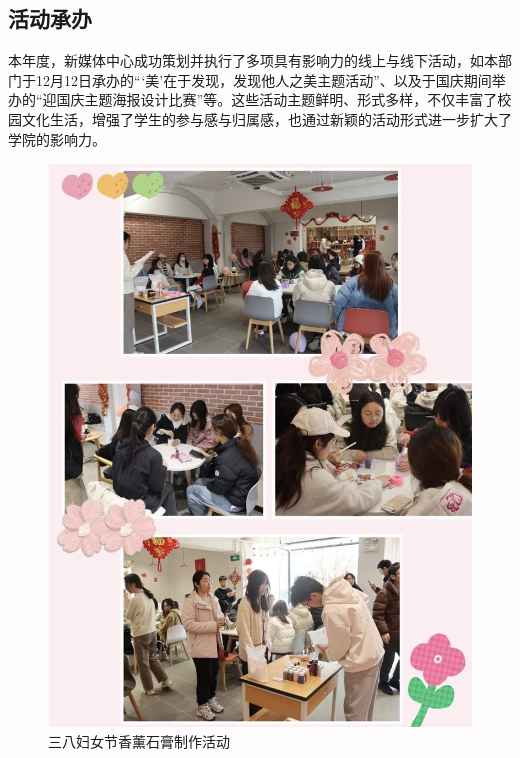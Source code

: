 \documentclass{article}
\begin{document}
\subsection{活动承办}
本年度，新媒体中心成功策划并执行了多项具有影响力的线上与线下活动，如本部门于12月12日承办的“‘美’在于发现，发现他人之美主题活动”、以及于国庆期间举办的“迎国庆主题海报设计比赛”等。这些活动主题鲜明、形式多样，不仅丰富了校园文化生活，增强了学生的参与感与归属感，也通过新颖的活动形式进一步扩大了学院的影响力。
\begin{figure}[H]
    \centering
    \begin{minipage}[b]{0.45\textwidth}
        \centering
        \includegraphics[width=\textwidth]{Figure4.png} %
        \caption{三八妇女节香薰石膏制作活动}
        \label{fig:image1}
    \end{minipage}
    \begin{minipage}[b]{0.45\textwidth}
        \centering

\end{minipage}
\end{figure}
\end{document}
